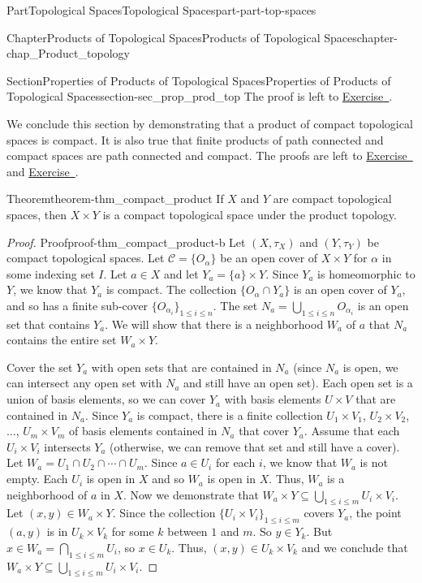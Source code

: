 \documentclass[oneside,10pt,]{book}
\newcommand{\xreffont}{\relax}
\numberwithin{equation}{chapter}
\newcommand{\CC}{\mathcal{C}}
\begin{document}
\begin{partptx}{Part}{Topological Spaces}{}{Topological Spaces}{}{}{part-part-top-spaces}
\begin{chapterptx}{Chapter}{Products of Topological Spaces}{}{Products of Topological Spaces}{}{}{chapter-chap_Product_topology}
\begin{sectionptx}{Section}{Properties of Products of Topological Spaces}{}{Properties of Products of Topological Spaces}{}{}{section-sec_prop_prod_top}
The proof is left to \hyperlink{exercise-ex_connected_product}{Exercise~{\xreffont 6}}.%
\par
We conclude this section by demonstrating that a product of compact topological spaces is compact. It is also true that finite products of path connected and compact spaces are path connected and compact. The proofs are left to \hyperlink{exercise-ex_compact_product}{Exercise~{\xreffont 7}} and \hyperlink{exercise-ex_path_connected_product}{Exercise~{\xreffont 8}}.%
\begin{theorem}{Theorem}{}{}{theorem-thm_compact_product}%
If \(X\) and \(Y\) are compact topological spaces, then \(X \times Y\) is a compact topological space under the product topology.%
\end{theorem}
\begin{proof}{Proof}{}{proof-thm_compact_product-b}
Let \((X, \tau_X)\) and \((Y, \tau_Y)\) be compact topological spaces. Let \(\CC = \{O_{\alpha}\}\) be an open cover of \(X \times Y\) for \(\alpha\) in some indexing set \(I\). Let \(a \in X\) and let \(Y_a = \{a\} \times Y\). Since \(Y_a\) is homeomorphic to \(Y\), we know that \(Y_a\) is compact. The collection \(\{O_{\alpha} \cap Y_a\}\) is an open cover of \(Y_a\), and so has a finite sub-cover \(\{O_{\alpha_i}\}_{1 \leq i \leq n}\). The set \(N_a = \bigcup_{1 \leq i \leq n} O_{\alpha_i}\) is an open set that contains \(Y_a\). We will show that there is a neighborhood \(W_a\) of \(a\) that \(N_a\) contains the entire set \(W_a \times Y\).%
\par
Cover the set \(Y_a\) with open sets that are contained in \(N_a\) (since \(N_a\) is open, we can intersect any open set with \(N_a\) and still have an open set). Each open set is a union of basis elements, so we can cover \(Y_a\) with basis elements \(U \times V\) that are contained in \(N_a\). Since \(Y_a\) is compact, there is a finite collection \(U_1 \times V_1\), \(U_2 \times V_2\), \(\ldots\), \(U_m \times V_m\) of basis elements contained in \(N_a\) that cover \(Y_a\). Assume that each \(U_i \times V_i\) intersects \(Y_a\) (otherwise, we can remove that set and still have a cover). Let \(W_a = U_1 \cap U_2 \cap \cdots \cap U_m\). Since \(a \in U_i\) for each \(i\), we know that \(W_a\) is not empty. Each \(U_i\) is open in \(X\) and so \(W_a\) is open in \(X\). Thus, \(W_a\) is a neighborhood of \(a\) in \(X\). Now we demonstrate that \(W_a \times Y \subseteq \bigcup_{1 \leq i \leq m} U_i \times V_i\). Let \((x,y) \in W_a \times Y\). Since the collection \(\{U_i \times V_i\}_{1 \leq i \leq m}\) covers \(Y_a\), the point \((a,y)\) is in \(U_k \times V_k\) for some \(k\) between \(1\) and \(m\). So \(y \in Y_k\). But \(x \in W_a = \bigcap_{1 \leq i \leq m} U_i\), so \(x \in U_k\). Thus, \((x,y) \in U_k \times V_k\) and we conclude that \(W_a \times Y \subseteq \bigcup_{1 \leq i \leq m} U_i \times V_i\).%

\end{proof}
\end{sectionptx}
\end{chapterptx}
\end{partptx}
\end{document}
